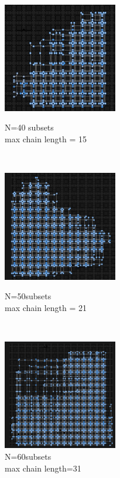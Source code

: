\documentclass[oneside,a4paper]{article}
\begin{document}
\begin{figure}[htp]
\centering
\begin{minipage}[b]{4.5cm}
\centering
\includegraphics[width=5cm]{LaTeXTemplate/Images/2000Qfirst40.png}
\caption{N=40 subsets\\max chain length = 15}
\end{minipage}
\ \hspace{2mm} \hspace{2mm} \
\begin{minipage}[b]{4.5cm}
\centering
\includegraphics[width=5cm]{LaTeXTemplate/Images/2000Qfirst50.png}
\caption{N=50subsets\\max chain length = 21}
\end{minipage}
\ \hspace{2mm} \hspace{2mm} \
\begin{minipage}[b]{4.5cm}
\centering
\includegraphics[width=5cm]{LaTeXTemplate/Images/2000Qfirst60.png}
\caption{N=60subsets\\max chain length=31}
\end{minipage}
\end{figure}
\end{document}
